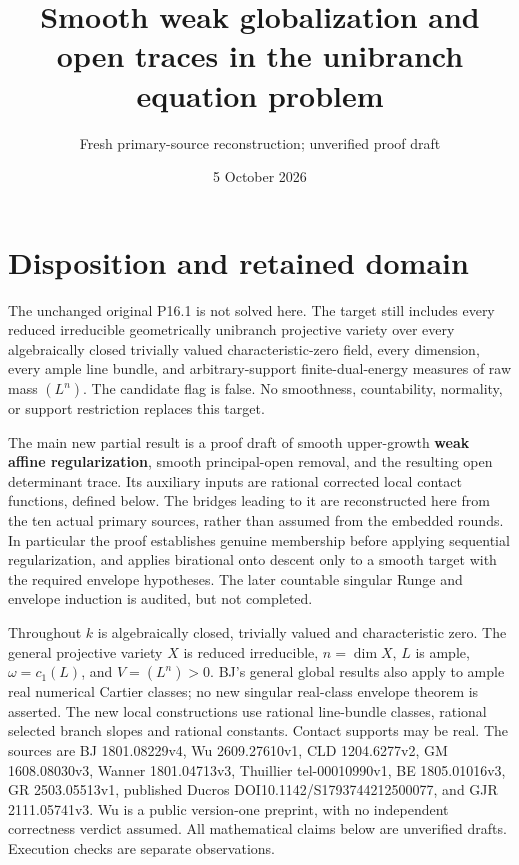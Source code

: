 \documentclass[
  10pt,
]{article}
\title{Smooth weak globalization and open traces in the unibranch
equation problem}
\author{Fresh primary-source reconstruction; unverified proof draft}
\date{5 October 2026}
\begin{document}
\maketitle

\section{Disposition and retained
domain}\label{disposition-and-retained-domain}

The unchanged original P16.1 is not solved here. The target still
includes every reduced irreducible geometrically unibranch projective
variety over every algebraically closed trivially valued
characteristic-zero field, every dimension, every ample line bundle, and
arbitrary-support finite-dual-energy measures of raw mass \((L^n)\). The
candidate flag is false. No smoothness, countability, normality, or
support restriction replaces this target.

The main new partial result is a proof draft of smooth upper-growth
\textbf{weak affine regularization}, smooth principal-open removal, and
the resulting open determinant trace. Its auxiliary inputs are rational
corrected local contact functions, defined below. The bridges leading to
it are reconstructed here from the ten actual primary sources, rather
than assumed from the embedded rounds. In particular the proof
establishes genuine membership before applying sequential
regularization, and applies birational onto descent only to a smooth
target with the required envelope hypotheses. The later countable
singular Runge and envelope induction is audited, but not completed.

Throughout \(k\) is algebraically closed, trivially valued and
characteristic zero. The general projective variety \(X\) is reduced
irreducible, \(n=\dim X\), \(L\) is ample, \(\omega=c_1(L)\), and
\(V=(L^n)>0\). BJ's general global results also apply to ample real
numerical Cartier classes; no new singular real-class envelope theorem
is asserted. The new local constructions use rational line-bundle
classes, rational selected branch slopes and rational constants. Contact
supports may be real. The sources are BJ 1801.08229v4, Wu 2609.27610v1,
CLD 1204.6277v2, GM 1608.08030v3, Wanner 1801.04713v3, Thuillier
tel-00010990v1, BE 1805.01016v3, GR 2503.05513v1, published Ducros
DOI10.1142/S1793744212500077, and GJR 2111.05741v3. Wu is a public
version-one preprint, with no independent correctness verdict assumed.
All mathematical claims below are unverified drafts. Execution checks
are separate observations.
\end{document}
